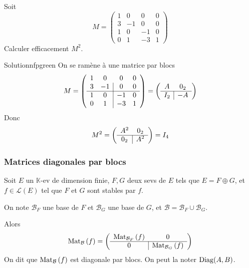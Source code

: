    \begin{exo}{}{}
        Soit 
        \[ M = \begin{pmatrix}
            1 & 0 & 0 & 0 \\
            3 & -1 & 0 & 0 \\
            1 & 0 & -1 & 0 \\
            0 & 1 & -3 & 1 
        \end{pmatrix} \]    
        Calculer efficacement $M^2$.
    \end{exo}

    \begin{demo}{Solution}{nfpgreen}
        On se ramène à une matrice par blocs 
        \[ M = \left( \begin{array}{cc | cc}
            1 & 0 & 0 & 0 \\
            3 & -1 & 0 & 0 \\
            \hline
            1 & 0 & -1 & 0 \\
            0 & 1 & -3 & 1 
        \end{array} \right) =  \left( \begin{array}{c | c}
            A & 0_2 \\
            \hline 
            I_2 & -A 
        \end{array} \right) \]
        Donc 
        \[ M^2 = \left( \begin{array}{c | c}
            A^2 & 0_2 \\
            \hline 
            0_2 & A^2 
        \end{array} \right) = I_4 \]
    \end{demo}

    \subsubsection{Matrices diagonales par blocs}

    \begin{prop}{}{}
        Soit $E$ un $\mathbb{K}$-ev de dimension finie, $F,G$ deux sevs de $E$ tels que $E = F \oplus G$, et $f \in \mathcal{L}(E)$ tel que $F$ et $G$ sont stables par $f$. 

        On note $\mathcal{B}_F$ une base de $F$ et $\mathcal{B}_G$ une base de $G$, et $\mathcal{B} = \mathcal{B}_F \cup \mathcal{B}_G$.

        Alors 
        \[ \text{Mat}_{\mathcal{B}}\left(f\right) = 
        \left( \begin{array}{c | c}
            \text{Mat}_{\mathcal{B}_F}\left(f\right) & 0 \\
            \hline 
            0 & \text{Mat}_{\mathcal{B}_G}\left(f\right)
        \end{array} \right) \]
        On dit que $\text{Mat}_{\mathcal{B}}\left(f\right)$ est diagonale par blocs. On peut la noter $\operatorname{Diag}(A,B)$.
    \end{prop}

